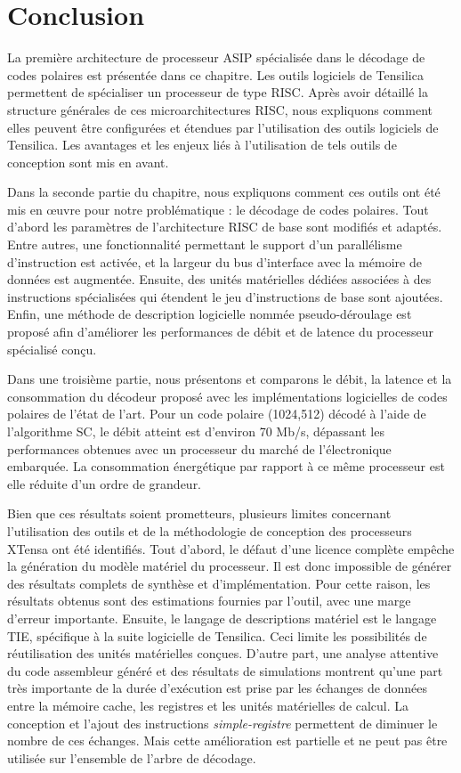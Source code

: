 \section*{Conclusion}

La première architecture de processeur ASIP spécialisée dans le décodage de codes polaires est présentée dans ce chapitre. Les outils logiciels de Tensilica permettent de spécialiser un processeur de type RISC. Après avoir détaillé la structure générales de ces microarchitectures RISC, nous expliquons comment elles peuvent être configurées et étendues par l'utilisation des outils logiciels de Tensilica. Les avantages et les enjeux liés à l'utilisation de tels outils de conception sont mis en avant.

Dans la seconde partie du chapitre, nous expliquons comment ces outils ont été mis en œuvre pour notre problématique : le décodage de codes polaires. Tout d'abord les paramètres de l'architecture RISC de base sont modifiés et adaptés. Entre autres, une fonctionnalité permettant le support d'un parallélisme d'instruction est activée, et la largeur du bus d'interface avec la mémoire de données est augmentée. Ensuite, des unités matérielles dédiées associées à des instructions spécialisées qui étendent le jeu d'instructions de base sont ajoutées. Enfin, une méthode de description logicielle nommée \og pseudo-déroulage \fg est proposé afin d'améliorer les performances de débit et de latence du processeur spécialisé conçu.

Dans une troisième partie, nous présentons et comparons le débit, la latence et la consommation du décodeur proposé avec les implémentations logicielles de codes polaires de l'état de l'art. Pour un code polaire (1024,512) décodé à l'aide de l'algorithme SC, le débit atteint est d'environ 70 Mb/s, dépassant les performances obtenues avec un processeur du marché de l'électronique embarquée. La consommation énergétique par rapport à ce même processeur est elle réduite d'un ordre de grandeur.

Bien que ces résultats soient prometteurs, plusieurs limites concernant l'utilisation des outils et de la méthodologie de conception des processeurs XTensa ont été identifiés. Tout d'abord, le défaut d'une licence complète empêche la génération du modèle matériel du processeur. Il est donc impossible de générer des résultats complets de synthèse et d'implémentation. Pour cette raison, les résultats obtenus sont des estimations fournies par l'outil, avec une marge d'erreur importante. Ensuite, le langage de descriptions matériel est le langage TIE, spécifique à la suite logicielle de Tensilica. Ceci limite les possibilités de réutilisation des unités matérielles conçues. D'autre part, une analyse attentive du code assembleur généré et des résultats de simulations montrent qu'une part très importante de la durée d'exécution est prise par les échanges de données entre la mémoire cache, les registres et les unités matérielles de calcul. La conception et l'ajout des instructions \textit{simple-registre} permettent de diminuer le nombre de ces échanges. Mais cette amélioration est partielle et ne peut pas être utilisée sur l'ensemble de l'arbre de décodage.

